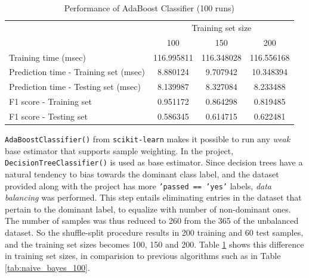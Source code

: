 \documentclass{article}
\begin{document}
	\begin{table}[h]
		\centering
		\begin{tabular}{l|ccc}
			\toprule
			{} & \multicolumn{3}{c}{Training set size} \\
			{} &         100 &         150 &         200 \\
			\midrule
			Training time (msec)                  &  116.995811 &  116.348028 &  116.556168 \\
			Prediction time - Training set (msec) &    8.880124 &    9.707942 &   10.348394 \\
			Prediction time - Testing set (msec)  &    8.139987 &    8.327084 &    8.233488 \\
			F1 score - Training set               &    0.951172 &    0.864298 &    0.819485 \\
			F1 score - Testing set                &    0.586345 &    0.614715 &    0.622481 \\
			\bottomrule
		\end{tabular}
		\caption{Performance of AdaBoost Classifier (100 runs)}
		\label{tab:adaboost_weak_100}
	\end{table}
	
	\texttt{AdaBoostClassifier()} from \texttt{scikit-learn} makes it possible to run any \emph{weak} base estimator that supports sample weighting. In the project, \texttt{DecisionTreeClassifier()} is used as base estimator. Since decision trees have a natural tendency to bias towards the dominant class label, and the dataset provided along with the project has more \texttt{'passed == 'yes'} labels,  \emph{data balancing} was performed. This step entails eliminating entries in the dataset that pertain to the dominant label, to equalize with number of non-dominant ones. The number of samples was thus reduced to 260 from the 365 of the unbalanced dataset. So the shuffle-split procedure results in 200 training and 60 test samples, and the training set sizes becomes 100, 150 and 200. Table \ref{tab:adaboost_weak_100} shows this difference in training set sizes, in comparision to previous algorithms such as in Table \ref{tab:naive_bayes_100}. 
	
\end{document}
